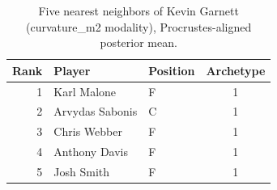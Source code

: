 \begin{table}[htbp]
  \centering\small
  \begin{tabular}{rllc}
    \toprule
    Rank & Player & Position & Archetype \\
    \midrule
    1 & Karl Malone & F & 1 \\
    2 & Arvydas Sabonis & C & 1 \\
    3 & Chris Webber & F & 1 \\
    4 & Anthony Davis & F & 1 \\
    5 & Josh Smith & F & 1 \\
    \bottomrule
  \end{tabular}
  \caption{Five nearest neighbors of Kevin Garnett (curvature_m2 modality), Procrustes-aligned posterior mean.}
  \label{tab:Kevin_Garnett_neighbors_curvature_m2}
\end{table}

